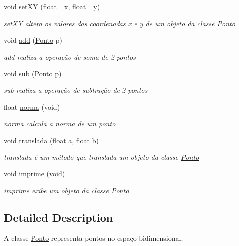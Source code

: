 \begin{DoxyCompactItemize}
void \hyperlink{class_ponto_a827488219a7da184d440f687cec49ce6}{set\+XY} (float \+\_\+x, float \+\_\+y)
\begin{DoxyCompactList}\small\item\em set\+XY altera os valores das coordenadas x e y de um objeto da classe \hyperlink{class_ponto}{Ponto} \end{DoxyCompactList}\item 
void \hyperlink{class_ponto_ad4eb84742e5823fcf4b7fe6f7b1202ed}{add} (\hyperlink{class_ponto}{Ponto} p)
\begin{DoxyCompactList}\small\item\em add realiza a operação de soma de 2 pontos \end{DoxyCompactList}\item 
void \hyperlink{class_ponto_a8863be0ba572c78b0133a6d49993df1b}{sub} (\hyperlink{class_ponto}{Ponto} p)
\begin{DoxyCompactList}\small\item\em sub realiza a operação de subtração de 2 pontos \end{DoxyCompactList}\item 
float \hyperlink{class_ponto_acf5167ec08bdd5fbf71bc6a4f1438edc}{norma} (void)
\begin{DoxyCompactList}\small\item\em norma calcula a norma de um ponto \end{DoxyCompactList}\item 
void \hyperlink{class_ponto_a96a4395204ec010814e67d20705e630f}{translada} (float a, float b)
\begin{DoxyCompactList}\small\item\em translada é um método que translada um objeto da classe \hyperlink{class_ponto}{Ponto} \end{DoxyCompactList}\item 
void \hyperlink{class_ponto_a527d46ce0fc24f112ead68980e52c2ca}{imprime} (void)
\begin{DoxyCompactList}\small\item\em imprime exibe um objeto da classe \hyperlink{class_ponto}{Ponto} \end{DoxyCompactList}\end{DoxyCompactItemize}


\subsection{Detailed Description}
A classe \hyperlink{class_ponto}{Ponto} representa pontos no espaço bidimensional. 

